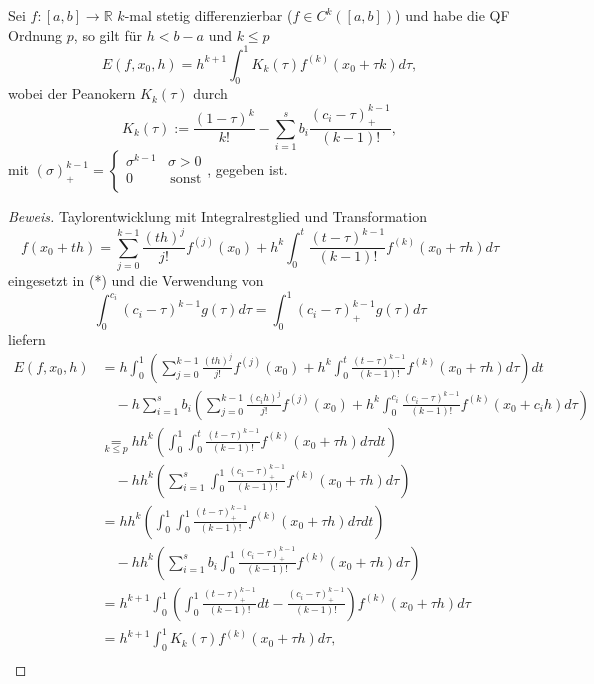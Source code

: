 \begin{nothing}
\begin{description}
  \item
\end{description}
\begin{description}
  \item[Satz 1:]
    Sei $f: [a, b] \rightarrow \mathbb{R}$ $k$-mal stetig differenzierbar ($f \in C^k([a, b])$) und habe die QF Ordnung $p$, so gilt für $h < b-a$ und $k \leq p$\\
    $$E(f, x_0, h) = h^{k+1} \int_0^1 K_k(\tau) f^{(k)}(x_0+\tau k) d\tau,$$
    wobei der Peanokern $K_k(\tau)$ durch 
    $$ K_k(\tau) := \frac{(1-\tau)^k}{k!} - \sum_{i=1}^s b_i \frac{(c_i - \tau)^{k-1}_+}{(k-1)!}, $$
    mit 
    $(\sigma)_+^{k-1} = \left\{
    \begin{array}{ll}
    \sigma ^{k-1} &  \sigma > 0 \\
    0 & \, \textrm{sonst} \\
    \end{array}
    \right. $, gegeben ist.
  \item \begin{proof}[Beweis] 
    Taylorentwicklung mit Integralrestglied und Transformation 
    $$f(x_0 + th) = \sum_{j=0}^{k-1} \frac{(th)^j}{j!} f^{(j)}(x_0) + h^k \int_0^t \frac{(t-\tau)^{k-1}}{(k-1)!} f^{(k)}(x_0+\tau h) d\tau$$
    eingesetzt in (*) und die Verwendung von 
    $$\int_0^{c_i} (c_i - \tau)^{k-1} g(\tau) d\tau = \int_0^1 (c_i-\tau)_+^{k-1} g(\tau) d\tau$$
    liefern
    \begin{align*} 
    E(f, x_0, h) &= h \int_0^1 \left( \sum_{j=0}^{k-1} \frac{(th)^j}{j!} f^{(j)}(x_0) + h^k \int_0^t \frac{(t-\tau)^{k-1}}{(k-1)!} f^{(k)}(x_0+\tau h) d\tau \right)dt &\\
    &\quad- h \sum_{i=1}^s b_i \left( \sum_{j=0}^{k-1} \frac{(c_ih)^j}{j!} f^{(j)}(x_0) + h^k \int_0^{c_i} \frac{(c_i-\tau)^{k-1}}{(k-1)!} f^{(k)}(x_0+c_ih) d\tau \right) &\\
    &\underset{k\leq p}{=} h h^k \left( \int_0^1 \int_0^t \frac{(t-\tau)^{k-1}}{(k-1)!} f^{(k)} (x_0 + \tau h) d\tau dt \right) &\\
    &\quad- h h^k \left(\sum_{i=1}^s \int_0^1 \frac{(c_i-\tau)^{k-1}_+}{(k-1)!} f^{(k)}(x_0+\tau h) d\tau \right)&\\
    &= h h^k \left( \int_0^1 \int_0^1 \frac{(t-\tau)^{k-1}_+}{(k-1)!} f^{(k)}(x_0+\tau h) d\tau dt \right) &\\
    &\quad - h h^k \left(\sum_{i=1}^s b_i \int_0^1 \frac{(c_i - \tau)^{k-1}_+}{(k-1)!} f^{(k)}(x_0+\tau h) d\tau \right)&\\
    &= h^{k+1} \int_0^1 \left( \int_0^1 \frac{(t-\tau)_+^{k-1}}{(k-1)!} dt - \frac{(c_i - \tau)_+^{k-1}}{(k-1)!} \right) f^{(k)}(x_0+\tau h) d\tau &\\
    &= h^{k+1} \int_0^1 K_k(\tau) f^{(k)}(x_0+\tau h) d\tau, &\\
    \end{align*}
    

\end{proof}
\end{description}
\end{nothing}
